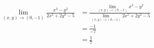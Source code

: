 \documentclass[12pt]{article} %
\begin{document}
\pagebreak

\begin{homeworkProblem}


    \begin{align*}
        \lim_{(x, y) \to (0, -1)} \frac{x^3 - y^2}{2x^5 + 2y^3 - 5}
         & =  \frac{\lim_{(x, y) \to (0, -1)}x^3 - y^2}{\lim_{(x, y) \to (0, -1)} 2x^5 + 2y^3 - 5} \\
         & = \frac{-1}{-7}                                                                         \\
         & = \frac{1}{7}
    \end{align*}

\end{homeworkProblem}

\pagebreak
\end{document}
